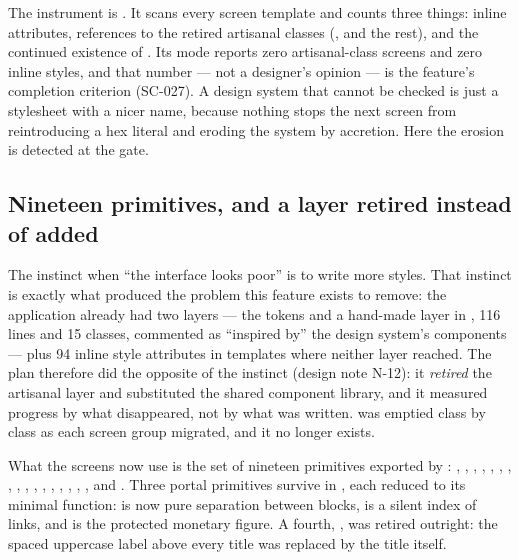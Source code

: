 The instrument is . It scans every screen template and
counts three things: inline  attributes, references to the retired artisanal
classes (,  and the rest), and the continued existence of
. Its  mode reports zero artisanal-class screens and zero inline
styles, and that number — not a designer's opinion — is the feature's completion criterion
(SC-027). A design system that cannot be checked is just a stylesheet with a nicer name, because
nothing stops the next screen from reintroducing a hex literal and eroding the system by
accretion. Here the erosion is detected at the gate.

\subsection{Nineteen primitives, and a layer retired instead of added}

The instinct when \enquote{the interface looks poor} is to write more styles. That instinct is
exactly what produced the problem this feature exists to remove: the application already had two
layers — the tokens and a hand-made layer in , 116 lines and 15 classes,
commented as \enquote{inspired by} the design system's components — plus 94 inline style
attributes in templates where neither layer reached. The plan therefore did the opposite of the
instinct (design note N-12): it \emph{retired} the artisanal layer and substituted the shared
component library, and it measured progress by what disappeared, not by what was written.
 was emptied class by class as each screen group migrated, and it no longer
exists.

What the screens now use is the set of nineteen primitives exported by
: , , , ,
, , , , ,
, , , ,
, , , ,  and
. Three portal primitives survive in , each reduced to
its minimal function:  is now pure separation between blocks,
 is a silent index of links, and  is the protected monetary figure.
A fourth, , was retired outright: the spaced uppercase label above every title
was replaced by the title itself.

